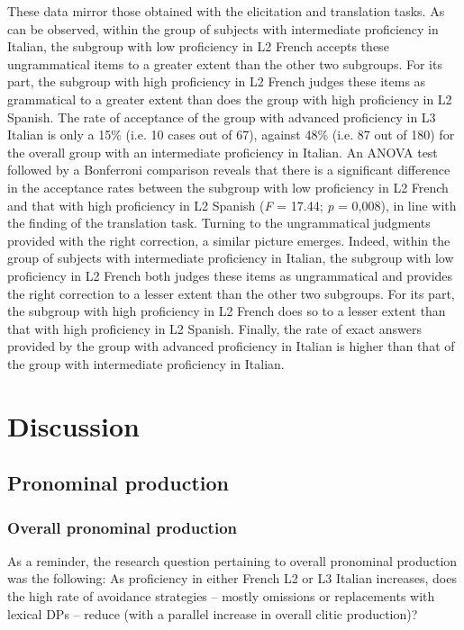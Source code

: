 \documentclass[output=paper,modfonts,nonflat,newtxmath]{langsci/langscibook}
\begin{document}
These data mirror those obtained with the elicitation and translation tasks. As can be observed, within the group of subjects with intermediate proficiency in Italian, the subgroup with low proficiency in L2 French accepts these ungrammatical items to a greater extent than the other two subgroups. For its part, the subgroup with high proficiency in L2 French judges these items as grammatical to a greater extent than does the group with high proficiency in L2 Spanish. The rate of acceptance of the group with advanced proficiency in L3 Italian is only a 15\% (i.e. 10 cases out of 67), against 48\% (i.e. 87 out of 180) for the overall group with an intermediate proficiency in Italian. An ANOVA test followed by a Bonferroni comparison reveals that there is a significant difference in the acceptance rates between the subgroup with low proficiency in L2 French and that with high proficiency in L2 Spanish (\textit{F} = 17.44; \textit{p} = 0,008), in line with the finding of the translation task. Turning to the ungrammatical judgments provided with the right correction, a similar picture emerges. Indeed, within the group of subjects with intermediate proficiency in Italian, the subgroup with low proficiency in L2 French both judges these items as ungrammatical and provides the right correction to a lesser extent than the other two subgroups. For its part, the subgroup with high proficiency in L2 French does so to a lesser extent than that with high proficiency in L2 Spanish. Finally, the rate of exact answers provided by the group with advanced proficiency in Italian is higher than that of the group with intermediate proficiency in Italian.

\section{Discussion} %
\label{sec:sciutti:5}

\subsection{Pronominal production} %
\label{sec:sciutti:5.1}

\subsubsection{Overall {pronominal} production} %

As a reminder, the research question pertaining to overall pronominal production was the following: As proficiency in either French L2 or L3 Italian increases, does the high rate of avoidance strategies – mostly omissions or replacements with lexical DPs – reduce (with a parallel increase in overall clitic production)?
\end{document}
